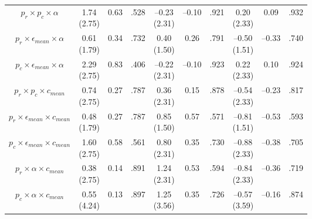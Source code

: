 \documentclass[
  11pt,
]{article}
\begin{document}
\begin{landscape}
\begin{ThreePartTable}
\begin{longtable}[t]{cccccccccc}
$p_r \times p_c \times \alpha$ & \makecell[c]{1.74\\(2.75)} & 0.63 & .528 & \makecell[c]{–0.23\\(2.31)} & –0.10 & .921 & \makecell[c]{0.20\\(2.33)} & 0.09 & .932\\
$p_r \times \epsilon_{mean} \times \alpha$ & \makecell[c]{0.61\\(1.79)} & 0.34 & .732 & \makecell[c]{0.40\\(1.50)} & 0.26 & .791 & \makecell[c]{–0.50\\(1.51)} & –0.33 & .740\\
\addlinespace
$p_c \times \epsilon_{mean} \times \alpha$ &  \makecell[c]{2.29\\(2.75)} & 0.83 & .406 & \makecell[c]{–0.22\\(2.31)} & –0.10 & .923 &  \makecell[c]{0.22\\(2.33)} & 0.10 & .924\\
$p_r \times p_c \times c_{mean}$ & \makecell[c]{0.74\\(2.75)} & 0.27 & .787 & \makecell[c]{0.36\\(2.31)} & 0.15 & .878 & \makecell[c]{–0.54\\(2.33)} & –0.23 & .817\\
$p_r \times \epsilon_{mean} \times c_{mean}$ & \makecell[c]{0.48\\(1.79)} & 0.27 & .787 & \makecell[c]{0.85\\(1.50)} & 0.57 & .571 & \makecell[c]{–0.81\\(1.51)} & –0.53 & .593\\
$p_c \times \epsilon_{mean} \times c_{mean}$ & \makecell[c]{1.60\\(2.75)} & 0.58 & .561 & \makecell[c]{0.80\\(2.31)} & 0.35 & .730 & \makecell[c]{–0.88\\(2.33)} & –0.38 & .705\\
$p_r \times \alpha \times c_{mean}$ & \makecell[c]{0.38\\(2.75)} & 0.14 & .891 & \makecell[c]{1.24\\(2.31)} & 0.53 & .594 & \makecell[c]{–0.84\\(2.33)} & –0.36 & .719\\
\addlinespace
$p_c \times \alpha \times c_{mean}$ & \makecell[c]{0.55\\(4.24)} & 0.13 & .897 & \makecell[c]{1.25\\(3.56)} & 0.35 & .726 & \makecell[c]{–0.57\\(3.59)} & –0.16 & .874\\

\end{longtable}
\end{ThreePartTable}
\end{landscape}
\end{document}
